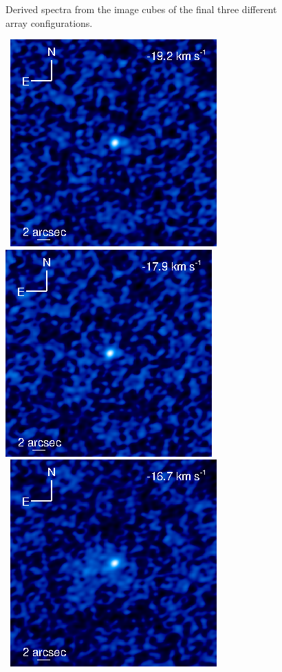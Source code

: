 \documentclass[manuscript]{aastex}
\begin{document}
\clearpage

\begin{figure}
{}
\caption{Derived spectra from the image cubes of the final three different array configurations.\label{fig1}}
\end{figure}

\clearpage

\begin{figure}[hbt!]
\mbox{
          \includegraphics[]{f2.eps}
          \includegraphics[]{f3.eps}
          }
\\
\mbox{
          \includegraphics[]{f4.eps}
}
\end{figure}
\end{document}
